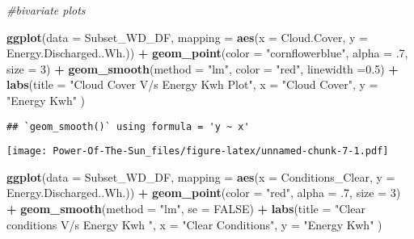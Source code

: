 \documentclass[
]{article}
\newenvironment{Shaded}{\begin{snugshade}}{\end{snugshade}}
\newcommand{\AttributeTok}[1]{\textcolor[rgb]{0.13,0.29,0.53}{#1}}
\newcommand{\CommentTok}[1]{\textcolor[rgb]{0.56,0.35,0.01}{\textit{#1}}}
\newcommand{\ConstantTok}[1]{\textcolor[rgb]{0.56,0.35,0.01}{#1}}
\newcommand{\DecValTok}[1]{\textcolor[rgb]{0.00,0.00,0.81}{#1}}
\newcommand{\FloatTok}[1]{\textcolor[rgb]{0.00,0.00,0.81}{#1}}
\newcommand{\FunctionTok}[1]{\textcolor[rgb]{0.13,0.29,0.53}{\textbf{#1}}}
\newcommand{\NormalTok}[1]{#1}
\newcommand{\SpecialCharTok}[1]{\textcolor[rgb]{0.81,0.36,0.00}{\textbf{#1}}}
\newcommand{\StringTok}[1]{\textcolor[rgb]{0.31,0.60,0.02}{#1}}
\begin{document}
\begin{Shaded}
\begin{Highlighting}[]
\CommentTok{\#bivariate plots }

\FunctionTok{ggplot}\NormalTok{(}\AttributeTok{data =}\NormalTok{ Subset\_WD\_DF, }
       \AttributeTok{mapping =} \FunctionTok{aes}\NormalTok{(}\AttributeTok{x =}\NormalTok{ Cloud.Cover, }
                     \AttributeTok{y =}\NormalTok{ Energy.Discharged..Wh.)) }\SpecialCharTok{+} 
  \FunctionTok{geom\_point}\NormalTok{(}\AttributeTok{color =} \StringTok{"cornflowerblue"}\NormalTok{, }
             \AttributeTok{alpha =}\NormalTok{ .}\DecValTok{7}\NormalTok{, }
             \AttributeTok{size =} \DecValTok{3}\NormalTok{) }\SpecialCharTok{+} 
  \FunctionTok{geom\_smooth}\NormalTok{(}\AttributeTok{method =} \StringTok{"lm"}\NormalTok{,}
              \AttributeTok{color =} \StringTok{"red"}\NormalTok{,}
              \AttributeTok{linewidth =}\FloatTok{0.5}\NormalTok{) }\SpecialCharTok{+}
    \FunctionTok{labs}\NormalTok{(}\AttributeTok{title =} \StringTok{"Cloud Cover V/s Energy Kwh Plot"}\NormalTok{,}
       \AttributeTok{x =} \StringTok{"Cloud Cover"}\NormalTok{, }
       \AttributeTok{y =} \StringTok{"Energy Kwh"}\NormalTok{ )}
\end{Highlighting}
\end{Shaded}

\begin{verbatim}
## `geom_smooth()` using formula = 'y ~ x'
\end{verbatim}

\texttt{[image: Power-Of-The-Sun\_files/figure-latex/unnamed-chunk-7-1.pdf]}

\begin{Shaded}
\begin{Highlighting}[]
\FunctionTok{ggplot}\NormalTok{(}\AttributeTok{data =}\NormalTok{ Subset\_WD\_DF, }
       \AttributeTok{mapping =} \FunctionTok{aes}\NormalTok{(}\AttributeTok{x =}\NormalTok{ Conditions\_Clear, }
                     \AttributeTok{y =}\NormalTok{ Energy.Discharged..Wh.)) }\SpecialCharTok{+} 
  \FunctionTok{geom\_point}\NormalTok{(}\AttributeTok{color =} \StringTok{"red"}\NormalTok{, }
             \AttributeTok{alpha =}\NormalTok{ .}\DecValTok{7}\NormalTok{, }
             \AttributeTok{size =} \DecValTok{3}\NormalTok{) }\SpecialCharTok{+} 
  \FunctionTok{geom\_smooth}\NormalTok{(}\AttributeTok{method =} \StringTok{"lm"}\NormalTok{,}
              \AttributeTok{se =} \ConstantTok{FALSE}\NormalTok{) }\SpecialCharTok{+}
      \FunctionTok{labs}\NormalTok{(}\AttributeTok{title =} \StringTok{"Clear conditions V/s Energy Kwh "}\NormalTok{,}
       \AttributeTok{x =} \StringTok{"Clear Conditions"}\NormalTok{, }
       \AttributeTok{y =} \StringTok{"Energy Kwh"}\NormalTok{ )}
\end{Highlighting}
\end{Shaded}
\end{document}
